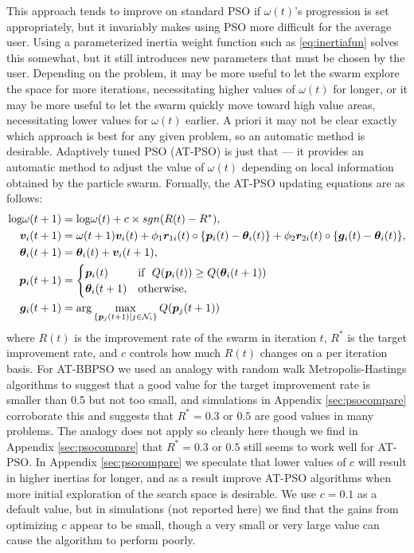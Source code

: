 \documentclass[12pt]{article}
\def\log{\hbox{log}}
\begin{document}
This approach tends to improve on standard PSO if $\omega(t)$'s progression is set appropriately, but it invariably makes using PSO more difficult for the average user. Using a parameterized inertia weight function such as \eqref{eq:inertiafun} solves this somewhat, but it still introduces new parameters that must be chosen by the user. Depending on the problem, it may be more useful to let the swarm explore the space for more iterations, necessitating higher values of $\omega(t)$ for longer, or it may be more useful to let the swarm quickly move toward high value areas, necessitating lower values for $\omega(t)$ earlier. A priori it may not be clear exactly which approach is best for any given problem, so an automatic method is desirable. Adaptively tuned PSO (AT-PSO) is just that --- it provides an automatic method to adjust the value of $\omega(t)$ depending on local information obtained by the particle swarm. Formally, the AT-PSO updating equations are as follows:
\begin{align}\label{eq:atpso}
\log\omega(t+1)& = \log\omega(t) + c\times sgn(R(t) - R^*),\nonumber\\
\bm{v}_i(t+1) &= \omega(t+1) \bm{v}_i(t) + \phi_1 \bm{r}_{1i}(t)\circ\{\bm{p}_i(t) - \bm{\theta}_i(t)\} + \phi_2 \bm{r}_{2i}(t)\circ\{\bm{g}_i(t) - \bm{\theta}_i(t)\},\nonumber\\
\bm{\theta}_i(t+1) &= \bm{\theta}_i(t) + \bm{v}_i(t+1),\nonumber\\
\bm{p}_i(t+1) &= \begin{cases} \bm{p}_i(t)   & \mbox{if }\  Q(\bm{p}_i(t)) \ge Q(\bm{\theta}_i(t + 1))\\
                               \bm{\theta}_i(t+1) & \mbox{otherwise},
\end{cases}\nonumber\\
\bm{g}_i(t+1) &= \arg\max_{\{\bm{p}_j(t+1)|j\in\mathcal{N}_i\}}Q(\bm{p}_j(t+1))
\end{align}
where $R(t)$ is the improvement rate of the swarm in iteration $t$, $R^*$ is the target improvement rate, and $c$ controls how much $R(t)$ changes on a per iteration basis. For AT-BBPSO we used an analogy with random walk Metropolis-Hastings algorithms to suggest that a good value for the target improvement rate is smaller than 0.5 but not too small, and simulations in Appendix \ref{sec:psocompare} corroborate this and suggests that $R^*=0.3$ or $0.5$ are good values in many problems. The analogy does not apply so cleanly here though we find in Appendix \ref{sec:psocompare} that $R^*=0.3$ or $0.5$ still seems to work well for AT-PSO. In Appendix \ref{sec:psocompare} we speculate that lower values of $c$ will result in higher inertias for longer, and as a result improve AT-PSO algorithms when more initial exploration of the search space is desirable. We use $c=0.1$ as a default value, but in simulations (not reported here) we find that the gains from optimizing $c$ appear to be small, though a very small or very large value can cause the algorithm to perform poorly.
\end{document}
